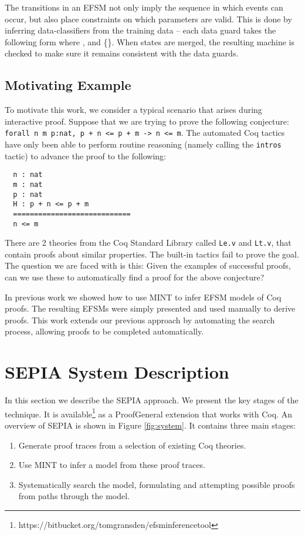 \documentclass{llncs}
\begin{document}
The transitions in an EFSM not only imply the sequence in which events can occur, but also place constraints on which parameters are valid. This is done by inferring data-classifiers from the training data -- each data guard takes the following form  where ,  and  \{\}. When states are merged, the resulting machine is checked to make sure it remains consistent with the data guards.

\subsection{Motivating Example}
To motivate this work, we consider a typical scenario that arises during interactive proof. Suppose that we are trying to prove the following conjecture: \texttt{forall n m p:nat, p + n <= p + m -> n <= m}. The automated Coq tactics \cite{BC04} have only been able to perform routine reasoning (namely calling the \texttt{intros} tactic) to advance the proof to the following:

\begin{lstlisting}
  n : nat
  m : nat
  p : nat
  H : p + n <= p + m
  ============================
  n <= m
\end{lstlisting}
 


There are 2 theories from the Coq Standard Library called \texttt{Le.v} and \texttt{Lt.v}, that contain proofs about similar properties. The built-in tactics fail to prove the goal. The question we are faced with is this: Given the examples of successful proofs, can we use these to automatically find a proof for the above conjecture? 

In previous work \cite{GransdenCICM} we showed how to use MINT to infer EFSM models of Coq proofs. The resulting EFSMs were simply presented and used manually to derive proofs. This work extends our previous approach by automating the search process, allowing proofs to be completed automatically.

\section{SEPIA System Description}
\label{sec:implementation}
In this section we describe the SEPIA approach. We present the key stages of the technique. It is available\footnote{https://bitbucket.org/tomgransden/efsminferencetool} as a ProofGeneral extension that works with Coq. An overview of SEPIA is shown in Figure \ref{fig:system}. It contains three main stages:
\begin{enumerate}
\item{Generate proof traces from a selection of existing Coq theories.}
\item{Use MINT to infer a model from these proof traces.}
\item{Systematically search the model, formulating and attempting possible proofs from paths through the model.}
\end{enumerate}
\end{document}

